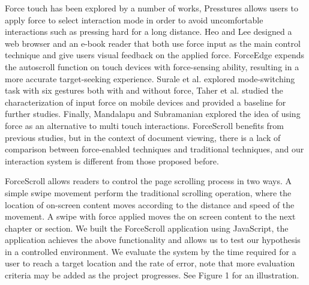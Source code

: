 \documentclass{sigchi}
\begin{document}
Force touch has been explored by a number of works, Presstures \cite{rendl2014presstures} allows users to apply force to select interaction mode in order to avoid uncomfortable interactions such as pressing hard for a long distance. Heo and Lee \cite{heo2011force} designed a web browser and an e-book reader that both use force input as the main control technique and give users visual feedback on the applied force. ForceEdge \cite{antoine2017forceedge} expends the autoscroll function on touch devices with force-sensing ability, resulting in a more accurate target-seeking experience. Surale et al. \cite{surale2017experimental} explored mode-switching task with six gestures both with and without force, Taher et al. \cite{taher2014empirical} studied the characterization of input force on mobile devices and provided a baseline for further studies. Finally, Mandalapu and Subramanian \cite{mandalapu2011exploring} explored the idea of using force as an alternative to multi touch interactions. ForceScroll benefits from previous studies, but in the context of document viewing, there is a lack of comparison between force-enabled techniques and traditional techniques, and our interaction system is different from those proposed before.          


ForceScroll allows readers to control the page scrolling process in two ways. A simple swipe movement perform the traditional scrolling operation, where the location of on-screen content moves according to the distance and speed of the movement. A swipe with force applied moves the on screen content to the next chapter or section. We built the ForceScroll application using JavaScript, the application achieves the above functionality and allows us to test our hypothesis in a controlled environment. We evaluate the system by the time required for a user to reach a target location and the rate of error, note that more evaluation criteria may be added as the project progresses. See Figure 1 for an illustration.  
\end{document}

